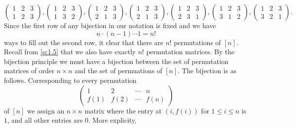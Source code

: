  \[
	 \begin{pmatrix} 1 & 2 & 3 \\ 1 & 2 & 3 \end{pmatrix}, \begin{pmatrix} 1 & 2 & 3 \\ 1 & 3 & 2 \end{pmatrix}, \begin{pmatrix} 1 & 2 & 3 \\ 2 & 1 & 3 \end{pmatrix}, \begin{pmatrix} 1 & 2 & 3 \\ 2 & 1 & 3 \end{pmatrix}, \begin{pmatrix} 1 & 2 & 3 \\ 2 & 3 & 1 \end{pmatrix}, \begin{pmatrix} 1 & 2 & 3 \\ 3 & 1 & 2\end{pmatrix}, \begin{pmatrix} 1 & 2 & 3 \\ 3 & 2 & 1 \end{pmatrix} 
.\]
Since the first row of any bijection in our notation is fixed and we have \[ n\cdot\left( n-1 \right) \cdots 1 = n!\] ways to fill out the second row, it clear that there are $n!$ permutations of $[n]$. Recall from \cref{q:1.5} that we also have exactly $n!$ permutation matrices. By the bijection principle we must have a bijection between the set of permutation matrices of order $n\times n$ and the set of permuations of $[n]$. The bijection is as follows. Corresponding to every permutation \[
\begin{pmatrix} 
	1 & 2 & \cdots & n \\
	f\left(1\right) & f\left( 2 \right) & \cdots & f\left( n \right)
\end{pmatrix} 
\] of $[n]$ we assign an $n\times n$ matrix where the entry at $\left( i,f\left(i  \right)  \right)$ for $1\leq i\leq n$ is $1$, and all other entries are $0$. More explicity,
